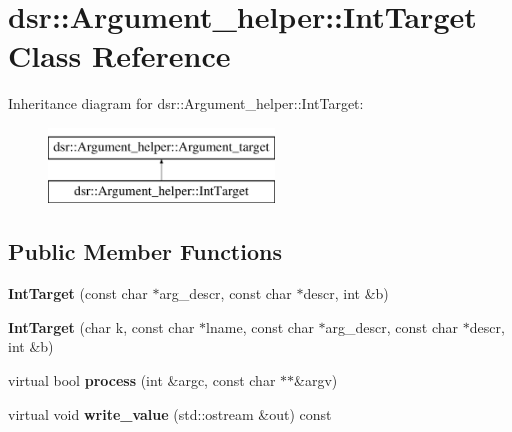 \hypertarget{classdsr_1_1_argument__helper_1_1_int_target}{
\section{dsr::Argument\_\-helper::IntTarget Class Reference}
\label{classdsr_1_1_argument__helper_1_1_int_target}
}
Inheritance diagram for dsr::Argument\_\-helper::IntTarget:\begin{figure}[H]
\begin{center}
\leavevmode
\includegraphics[height=2.000000cm]{classdsr_1_1_argument__helper_1_1_int_target}
\end{center}
\end{figure}
\subsection*{Public Member Functions}
\begin{DoxyCompactItemize}
\item 
\hypertarget{classdsr_1_1_argument__helper_1_1_int_target_a1171f49a361db468253da0c5a900e2b6}{
{\bfseries IntTarget} (const char $\ast$arg\_\-descr, const char $\ast$descr, int \&b)}
\label{classdsr_1_1_argument__helper_1_1_int_target_a1171f49a361db468253da0c5a900e2b6}

\item 
\hypertarget{classdsr_1_1_argument__helper_1_1_int_target_a3efaed5093d6c20bcf65ea19edcff2bb}{
{\bfseries IntTarget} (char k, const char $\ast$lname, const char $\ast$arg\_\-descr, const char $\ast$descr, int \&b)}
\label{classdsr_1_1_argument__helper_1_1_int_target_a3efaed5093d6c20bcf65ea19edcff2bb}

\item 
\hypertarget{classdsr_1_1_argument__helper_1_1_int_target_a83b77c377f15298ff2d2149c1e460004}{
virtual bool {\bfseries process} (int \&argc, const char $\ast$$\ast$\&argv)}
\label{classdsr_1_1_argument__helper_1_1_int_target_a83b77c377f15298ff2d2149c1e460004}

\item 
\hypertarget{classdsr_1_1_argument__helper_1_1_int_target_a7d2d812aa5a2b6530ca69ebb12b7541d}{
virtual void {\bfseries write\_\-value} (std::ostream \&out) const }
\label{classdsr_1_1_argument__helper_1_1_int_target_a7d2d812aa5a2b6530ca69ebb12b7541d}

\end{DoxyCompactItemize}
